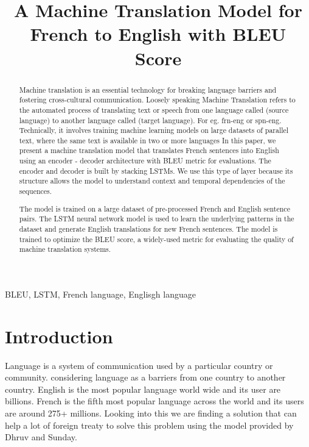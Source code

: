 \documentclass{article}
\title{A Machine Translation Model for French to English with BLEU Score}
\begin{document}
\maketitle

\begin{abstract}

Machine translation is an essential technology for breaking language barriers and fostering cross-cultural communication.
Loosely speaking Machine Translation refers to the automated process of translating text or speech from one language called (source language) to another language called (target language). For eg. frn-eng or spn-eng.
Technically, it involves training machine learning models on large datasets of parallel text, where the same text is available in two or more languages
In this paper, we present a machine translation model that translates French sentences into English using an encoder - decoder architecture with BLEU metric for evaluations. The encoder and decoder is built by stacking LSTMs. We use this type of layer because its structure allows the model to understand context and temporal dependencies of the sequences.

The model is trained on a large dataset of pre-processed French and English sentence pairs. The LSTM neural network model is used to learn the underlying patterns in the dataset and generate English translations for new French sentences. The model is trained to optimize the BLEU score, a widely-used metric for evaluating the quality of machine translation systems.


\end{abstract}
%
\begin{keywords}
BLEU, LSTM, French language, Englisgh language  
\end{keywords}

\section{Introduction}

Language is a system of communication used by a particular country or community. considering language as a barriers from one country to another country. English is the most popular language world wide and its user are billions. French is the fifth most popular language across the world and its users are around 275+ millions. Looking into this we are finding a solution that can help a lot of foreign treaty to solve this problem using the model provided by Dhruv and Sunday.
\end{document}
